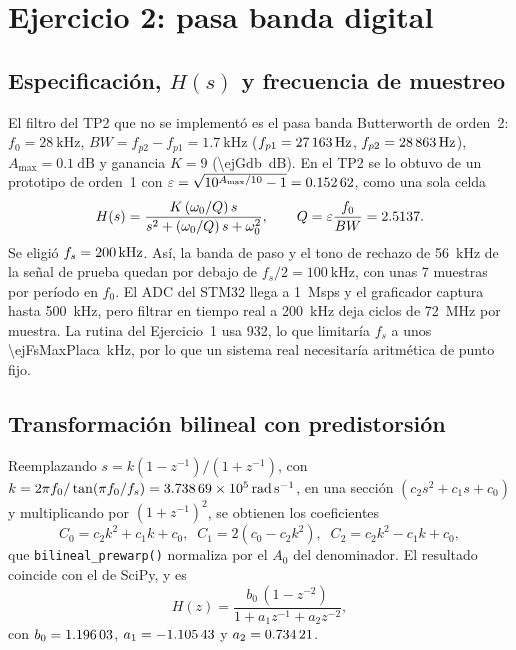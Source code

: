 \section{Ejercicio 2: pasa banda digital}

\subsection{Especificación, $H(s)$ y frecuencia de muestreo}
El filtro del TP2 que no se implementó es el pasa banda Butterworth de orden~2: $f_0 = \SI{28}{\kilo\hertz}$, $BW = f_{p2} - f_{p1} = \SI{1,7}{\kilo\hertz}$ ($f_{p1} = \SI{27163}{\hertz}$, $f_{p2} = \SI{28863}{\hertz}$), $A_\mathrm{max} = \SI{0,1}{\dB}$ y ganancia $K = 9$ (\SI{\ejGdb}{\dB}). En el TP2 se lo obtuvo de un prototipo de orden~1 con $\varepsilon = \sqrt{10^{A_\mathrm{max}/10} - 1} = \num{0,15262}$, como una sola celda
\begin{equation}
H(s) = \frac{K\,(\omega_0/Q)\,s}{s^2 + (\omega_0/Q)\,s + \omega_0^2}, \qquad Q = \varepsilon\frac{f_0}{BW} = \num{2,5137}.
\label{eq:hspba}
\end{equation}
Se eligió $f_s = \SI{200}{\kilo\hertz}$. Así, la banda de paso y el tono de rechazo de \SI{56}{\kilo\hertz} de la señal de prueba quedan por debajo de $f_s/2 = \SI{100}{\kilo\hertz}$, con unas 7 muestras por período en $f_0$. El ADC del STM32 llega a 1~Msps y el graficador captura hasta \SI{500}{\kilo\hertz}, pero filtrar en tiempo real a \SI{200}{\kilo\hertz} deja \ejCiclos{} ciclos de \SI{72}{\mega\hertz} por muestra. La rutina del Ejercicio~1 usa 932, lo que limitaría $f_s$ a unos \SI{\ejFsMaxPlaca}{\kilo\hertz}, por lo que un sistema real necesitaría aritmética de punto fijo.

\subsection{Transformación bilineal con predistorsión}
Reemplazando $s = k(1 - z^{-1})/(1 + z^{-1})$, con $k = 2\pi f_0/\tan(\pi f_0/f_s) = \num{3.73869e+05}\,\si{\radian\per\second}$, en una sección $(c_2 s^2 + c_1 s + c_0)$ y multiplicando por $(1 + z^{-1})^2$, se obtienen los coeficientes
\begin{equation}
C_0 = c_2 k^2 + c_1 k + c_0, \;\; C_1 = 2(c_0 - c_2 k^2), \;\; C_2 = c_2 k^2 - c_1 k + c_0,
\end{equation}
que \texttt{bilineal\_prewarp()} normaliza por el $A_0$ del denominador. El resultado coincide con el de SciPy, y es
\begin{equation}
H(z) = \frac{b_0\,(1 - z^{-2})}{1 + a_1 z^{-1} + a_2 z^{-2}},
\label{eq:hzpba}
\end{equation}
con $b_0 = \num{1,19603}$, $a_1 = \num{-1,10543}$ y $a_2 = \num{0,73421}$.

